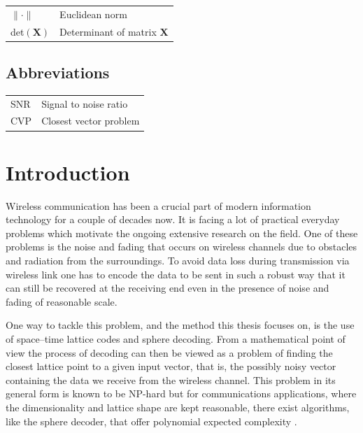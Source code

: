 \documentclass[english,12pt,a4paper,pdftex,sci,utf8]{aaltothesis}
\begin{document}
\begin{tabular}{ll}
$\| \cdot \| $     & Euclidean norm \\
det$(\mathbf{X})$  & Determinant of matrix $\mathbf{X}$
\end{tabular}

\subsection*{Abbreviations}

\begin{tabular}{ll}
SNR & Signal to noise ratio \\
CVP & Closest vector problem
\end{tabular}


\cleardoublepage
\storeinipagenumber
{}
\setcounter{page}{1}


\section{Introduction}
Wireless communication has been a crucial part of modern information technology for a couple of decades now. It is facing a lot of practical everyday problems which motivate the ongoing extensive research on the field. One of these problems is the noise and fading that occurs on wireless channels due to obstacles and radiation from the surroundings. To avoid data loss during transmission via wireless link one has to encode the data to be sent in such a robust way that it can still be recovered at the receiving end even in the presence of noise and fading of reasonable scale. 
\par One way to tackle this problem, and the method this thesis focuses on, is the use of space--time lattice codes and sphere decoding. From a mathematical point of view the process of decoding can then be viewed as a problem of finding the closest lattice point to a given input vector, that is, the possibly noisy vector containing the data we receive from the wireless channel. This problem in its general form is known to be NP-hard but for communications applications, where the dimensionality and lattice shape are kept reasonable, there exist algorithms, like the sphere decoder, that offer polynomial expected complexity \cite{mia}.
\end{document}
